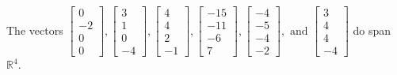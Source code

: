 \begin{exercise}
\begin{exerciseStatement}
  \end{exerciseStatement}
  \begin{exerciseAnswer}
   The vectors \(\left[\begin{array}{r}
0 \\
-2 \\
0 \\
0
\end{array}\right] , \left[\begin{array}{r}
3 \\
1 \\
0 \\
-4
\end{array}\right] , \left[\begin{array}{r}
4 \\
4 \\
2 \\
-1
\end{array}\right] , \left[\begin{array}{r}
-15 \\
-11 \\
-6 \\
7
\end{array}\right] , \left[\begin{array}{r}
-4 \\
-5 \\
-4 \\
-2
\end{array}\right] , \text{ and } \left[\begin{array}{r}
3 \\
4 \\
4 \\
-4
\end{array}\right]\) 
  	 do  
	span \(\mathbb{R}^4\).
  


  \end{exerciseAnswer}
\end{exercise}